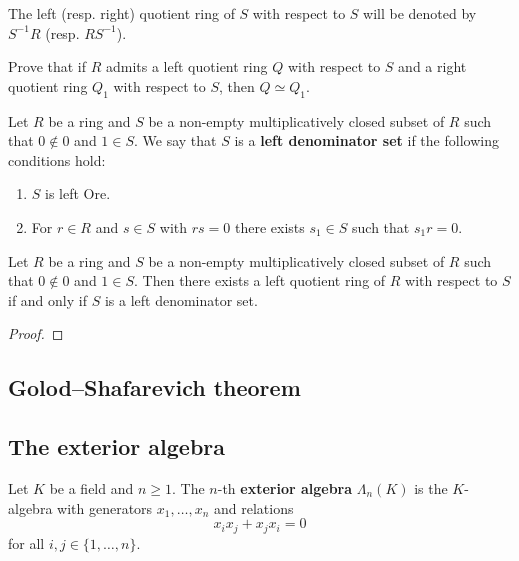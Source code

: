 The left (resp. right) quotient ring of $S$ 
with respect to $S$ will be denoted by $S^{-1}R$ (resp. $RS^{-1}$). 

\begin{exercise}
    Prove that if $R$ admits a left quotient ring $Q$ with respect to $S$ and a right quotient ring $Q_1$ with
    respect to $S$, then $Q\simeq Q_1$.  
\end{exercise}

\begin{definition}
    Let $R$ be a ring and 
    $S$ be a non-empty multiplicatively closed subset of $R$ such that $0\not\in 0$ and 
    $1\in S$. We say that $S$ is a \textbf{left denominator set} if 
    the following conditions hold:
    \begin{enumerate}
        \item $S$ is left Ore.
        \item For $r\in R$ and $s\in S$ with $rs=0$ there exists $s_1\in S$ such that $s_1r=0$. 
    \end{enumerate}
\end{definition}

\begin{theorem}
    Let $R$ be a ring and $S$ be a non-empty multiplicatively closed subset of $R$ such that $0\not\in 0$ and 
    $1\in S$. Then there exists a left quotient ring of $R$ with respect to $S$
    if and only if $S$ is a left denominator set. 
\end{theorem}

\begin{proof}
    
\end{proof}

\subsection{Golod--Shafarevich theorem}

\subsection{The exterior algebra}

\begin{definition}
    Let $K$ be a field and $n\geq1$. The $n$-th 
    \textbf{exterior algebra} 
    $\Lambda_n(K)$ is the $K$-algebra
    with generators $x_1,\dots,x_n$ and relations 
    \[
    x_ix_j+x_jx_i=0
    \]
    for all $i,j\in\{1,\dots,n\}$. 
\end{definition}


